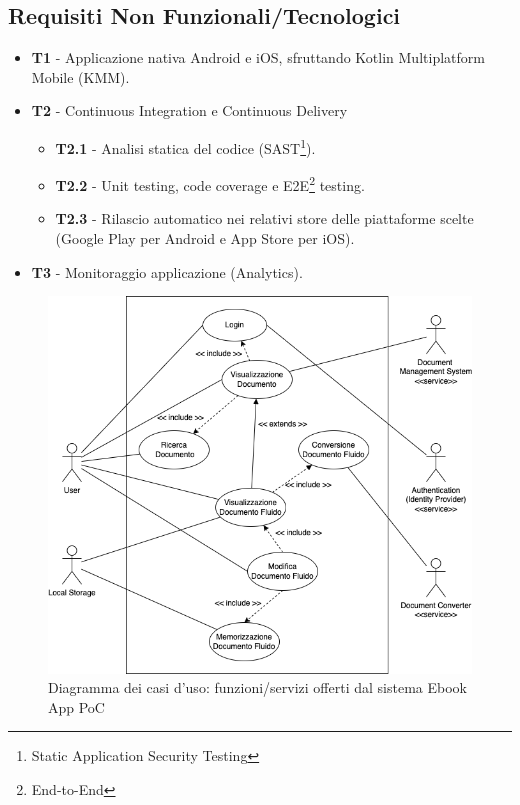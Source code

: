 \subsection{Requisiti Non Funzionali/Tecnologici}
\begin{itemize}
    \item \textbf{T1} - Applicazione nativa Android e iOS, sfruttando Kotlin Multiplatform Mobile (KMM).
    \item \textbf{T2} - Continuous Integration e Continuous Delivery
    \begin{itemize}
        \item \textbf{T2.1} - Analisi statica del codice (SAST\footnote{Static Application Security Testing}).
        \item \textbf{T2.2} - Unit testing, code coverage e E2E\footnote{End-to-End} testing.
        \item \textbf{T2.3} - Rilascio automatico nei relativi store delle piattaforme scelte (Google Play per Android e App Store per iOS).
    \end{itemize}
    \item \textbf{T3} - Monitoraggio applicazione (Analytics).
\end{itemize}

\begin{figure}[H]
\centering
\includegraphics[width=1\textwidth]{img/tesi-1-Use-case.drawio.png}
\caption{Diagramma dei casi d'uso: funzioni/servizi offerti dal sistema Ebook App PoC}
\end{figure}

